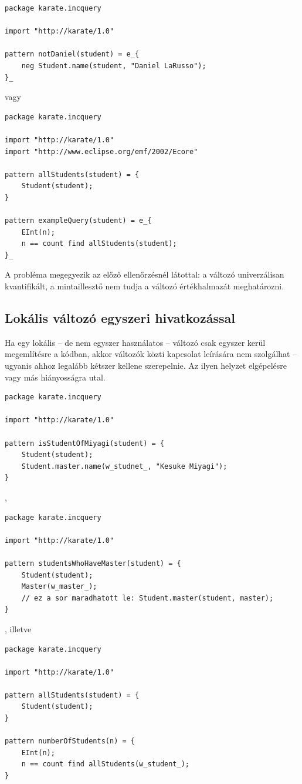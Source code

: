 \begin{lstlisting}
package karate.incquery

import "http://karate/1.0"

pattern notDaniel(student) = e_{
    neg Student.name(student, "Daniel LaRusso");
}_
\end{lstlisting}
%
%
vagy
%
\begin{lstlisting}
package karate.incquery

import "http://karate/1.0"
import "http://www.eclipse.org/emf/2002/Ecore"

pattern allStudents(student) = {
    Student(student);
}

pattern exampleQuery(student) = e_{
    EInt(n);
    n == count find allStudents(student);
}_
\end{lstlisting}
%
%
A probléma megegyezik az előző ellenőrzésnél látottal: a változó univerzálisan kvantifikált, a mintaillesztő nem tudja a változó értékhalmazát meghatározni.

\subsection{Lokális változó egyszeri hivatkozással}

Ha egy lokális -- de nem egyszer használatos -- változó csak egyszer kerül megemlítésre a kódban, akkor változók közti kapcsolat leírására nem szolgálhat -- ugyanis ahhoz legalább kétszer kellene szerepelnie.
Az ilyen helyzet elgépelésre vagy más hiányosságra utal.

\begin{lstlisting}
package karate.incquery

import "http://karate/1.0"

pattern isStudentOfMiyagi(student) = {
    Student(student);
    Student.master.name(w_studnet_, "Kesuke Miyagi");
}
\end{lstlisting}
,
\begin{lstlisting}
package karate.incquery

import "http://karate/1.0"

pattern studentsWhoHaveMaster(student) = {
    Student(student);
    Master(w_master_);
    // ez a sor maradhatott le: Student.master(student, master);
}
\end{lstlisting}
, illetve
%
\begin{lstlisting}
package karate.incquery

import "http://karate/1.0"

pattern allStudents(student) = {
    Student(student);
}

pattern numberOfStudents(n) = {
    EInt(n);
    n == count find allStudents(w_student_);
}
\end{lstlisting}

